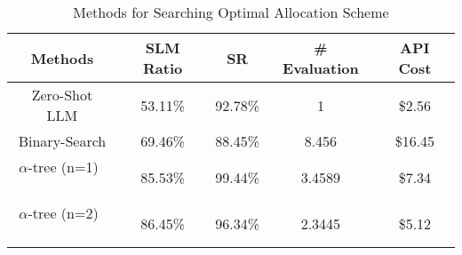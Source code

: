 \begin{table}
\centering
\resizebox{\linewidth}{!}
{
\begin{tabular}{c|c|c|c|c}
\textbf{Methods}              & \textbf{SLM Ratio} & \textbf{SR} & \textbf{\# Evaluation} & \textbf{API Cost}  \\ 
\hline
Zero-Shot LLM                    & 53.11\%            & 92.78\%     & 1                    & \$2.56             \\
Binary-Search                & 69.46\%            & 88.45\%     & 8.456                & \$16.45            \\
$\alpha$-tree (n=1)~ ~ & 85.53\%            & 99.44\%     & 3.4589               & \$7.34             \\
$\alpha$-tree (n=2)~ ~ & 86.45\%            & 96.34\%      & 2.3445               & \$5.12            
\end{tabular}
}

\vspace{1mm}
\caption{Methods for Searching Optimal Allocation Scheme}
\label{tbl:allocation}
\vspace{-7mm}
\end{table}


